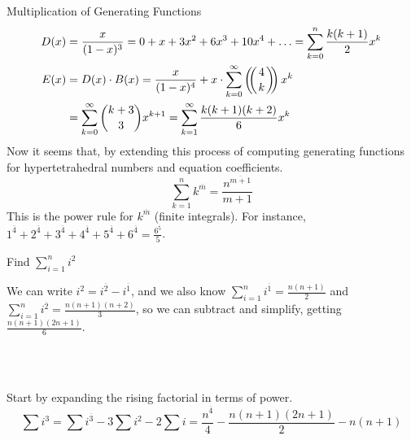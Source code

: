 \documentclass[11pt,twosided]{article}
\def\multiset#1#2{\left(\!\!\left({#1\atopwithdelims..#2}\right)\!\!\right)}
\begin{document}
\begin{section}{Multiplication of Generating Functions}
\begin{align*}
    D(x) &= \frac{x}{(1-x)^3} = 0 + x + 3x^2 + 6x^3 + 10x^4 + \ldots = \sum_{k = 0}^{n}\frac{k(k+1)}{2}x^k \\
    E(x) &= D(x)\cdot B(x) = \frac{x}{(1-x)^4} + x\cdot \sum_{k=0}^\infty \multiset{4}{k}x^k \\
    &= \sum_{k=0}^\infty {{k+3}\choose 3} x^{k+1} = \sum_{k=1}^\infty \frac{k(k+1)(k+2)}{6}x^k
\end{align*}
Now it seems that, by extending this process of computing generating functions for hypertetrahedral numbers and equation coefficients. 
$$\sum_{k=1}^n k^{\overline{m}} = \frac{n^{\overline{m+1}}}{m+1}$$
This is the power rule for $k^{\overline{m}}$ (finite integrals).
For instance, $1^{\overline{4}} + 2^{\overline{4}} + 3^{\overline{4}} + 4^{\overline{4}} + 5^{\overline{4}} + 6^{\overline{4}} = \frac{6^{\overline{5}}}{5}$.
\begin{problem}{1}
Find $\sum_{i=1}^n i^2$
\end{problem}
\begin{solution}
We can write $i^2 = i^{\overline{2}} - i^{\overline{1}}$, and we also know
$\sum_{i=1}^n i^{\overline{1}} = \frac{n(n+1)}{2}$ and $\sum_{i=1}^n i^{\overline{2}} = \frac{n(n+1)(n+2)}{3}$, so we can subtract and simplify, getting $\frac{n(n+1)(2n+1)}{6}$.
\end{solution} \\
\\
\begin{solution}
Start by expanding the rising factorial in terms of power.
$$\sum i^3 = \sum i^{\overline{3}} - 3\sum i^2 - 2\sum i = \frac{n^{\overline{4}}}{4} - \frac{n(n+1)(2n+1)}{2} - n(n+1)$$
\end{solution}

\end{section}
\end{document}
